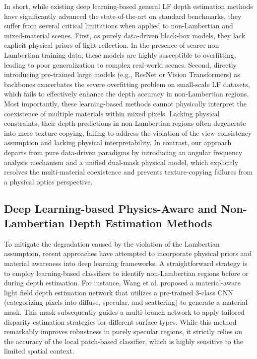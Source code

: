 In short, while existing deep learning-based general LF depth estimation methods have significantly advanced the state-of-the-art on standard benchmarks, they suffer from several critical limitations when applied to non-Lambertian and mixed-material scenes. First, as purely data-driven black-box models, they lack explicit physical priors of light reflection. In the presence of scarce non-Lambertian training data, these models are highly susceptible to overfitting, leading to poor generalization to complex real-world scenes. Second, directly introducing pre-trained large models (e.g., ResNet or Vision Transformers) as backbones exacerbates the severe overfitting problem on small-scale LF datasets, which fails to effectively enhance the depth accuracy in non-Lambertian regions. Most importantly, these learning-based methods cannot physically interpret the coexistence of multiple materials within mixed pixels. Lacking physical constraints, their depth predictions in non-Lambertian regions often degenerate into mere texture copying, failing to address the violation of the view-consistency assumption and lacking physical interpretability. In contrast, our approach departs from pure data-driven paradigms by introducing an angular frequency analysis mechanism and a unified dual-mask physical model, which explicitly resolves the multi-material coexistence and prevents texture-copying failures from a physical optics perspective.

\subsection{Deep Learning-based Physics-Aware and Non-Lambertian Depth Estimation Methods}

To mitigate the degradation caused by the violation of the Lambertian assumption, recent approaches have attempted to incorporate physical priors and material awareness into deep learning frameworks. A straightforward strategy is to employ learning-based classifiers to identify non-Lambertian regions before or during depth estimation. For instance, Wang et al. \cite{materialawarelightfieldspe} proposed a material-aware light field depth estimation network that utilizes a pre-trained 3-class CNN (categorizing pixels into diffuse, specular, and scattering) to generate a material mask. This mask subsequently guides a multi-branch network to apply tailored disparity estimation strategies for different surface types. While this method remarkably improves robustness in purely specular regions, it strictly relies on the accuracy of the local patch-based classifier, which is highly sensitive to the limited spatial context.

